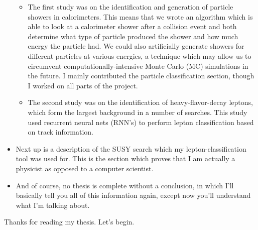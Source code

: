 \begin{itemize}
\begin{itemize}
        \item The first study was on the identification and generation of particle showers in calorimeters. This means that we wrote an algorithm which is able to look at a calorimeter shower after a collision event and both determine what type of particle produced the shower and how much energy the particle had. We could also artificially generate showers for different particles at various energies, a technique which may allow us to circumvent computationally-intensive Monte Carlo (MC) simulations in the future. I mainly contributed the particle classification section, though I worked on all parts of the project.

        \item The second study was on the identification of heavy-flavor-decay leptons, which form the largest background in a number of searches. This study used recurrent neural nets (RNN's) to perform lepton classification based on track information.

    \end{itemize}
    
    \item Next up is a description of the SUSY search which my lepton-classification tool was used for. This is the section which proves that I am actually a physicist as opposed to a computer scientist.
    
    \item And of course, no thesis is complete without a conclusion, in which I'll basically tell you all of this information again, except now you'll understand what I'm talking about.

\end{itemize}

Thanks for reading my thesis. Let's begin.